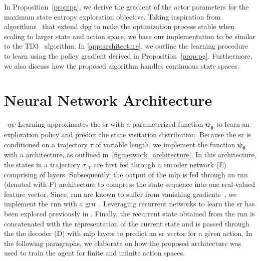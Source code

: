 \documentclass{article}
\theoremstyle{plain}
\theoremstyle{definition}
\theoremstyle{remark}
\newcommand{\alg}{$\eta$$\psi$-Learning}
\begin{document}
In Proposition~\ref{prop:pg}, we derive the gradient of the actor parameters for the maximum state entropy exploration objective.
Taking inspiration from algorithms~\citep{lillicrap2015ddpg,fujimoto2018td3,haarnoja2018soft} that extend \gls{dpg} to make the optimization process stable when scaling to larger state and action space, we base our implementation to be similar to the TD3~\citep{fujimoto2018td3} algorithm.
In \autoref{app:architecture}, we outline the learning procedure to learn using the policy gradient derived in Proposition~\ref{prop:pg}. 
Furthermore, we also discuss how the proposed algorithm handles continuous state spaces.


\section{Neural Network Architecture}
\label{app:architecture}

~\alg{} approximates the \gls{sr} with a parameterized function $\pmb{\psi}_{\pmb{\theta}}$ to learn an exploration policy and predict the state visitation distribution.
Because the \gls{sr} is conditioned on a trajectory $\tau$ of variable length, we implement the function $\pmb{\psi}_{\pmb{\theta}}$ with a  architecture, as outlined in~\autoref{fig:network_architecture}.
In this architecture, the states in a trajectory $\tau_{:T}$ are first fed through a encoder network (E) comprising of  layers.
Subsequently, the output of the \gls{mlp} is fed through an \gls{rnn} (denoted with F) architecture to compress the state sequence into one real-valued feature vector.
Since, \gls{rnn} are known to suffer from vanishing gradients~\cite{bengio1994learning}, we implement the \gls{rnn} with a \gls{gru}~\cite{cho2014gru}. 
Leveraging recurrent networks to learn the \gls{sr} has been explored previously in \citep{barreto2018transfer, borsa2018universal}. 
Finally, the recurrent state obtained from the \gls{rnn} is concatenated with the representation of the current state and is passed through the the decoder (D) with \gls{mlp} layers to predict an \gls{sr} vector for a given action. 
In the following paragraphs, we elaborate on how the proposed architecture was used to train the agent for finite and infinite action spaces.
\end{document}
